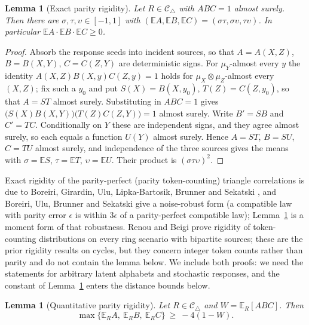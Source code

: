\documentclass[11pt]{article}
\theoremstyle{plain}
\newtheorem{lemma}[theorem]{Lemma}
\theoremstyle{definition}
\newcommand{\Ctri}{\mathcal C_{\triangle}}
\newcommand{\E}{\mathbb E}
\begin{document}
\begin{lemma}[Exact parity rigidity]\label{lem:parityrigidity}
Let $R\in\Ctri$ with $ABC=1$ almost surely. Then there are $\sigma,\tau,\upsilon\in[-1,1]$ with $(\E A,\E B,\E C)=(\sigma\tau,\sigma\upsilon,\tau\upsilon)$. In particular $\E A\cdot\E B\cdot\E C\ge0$.
\end{lemma}

\begin{proof}
Absorb the response seeds into incident sources, so that $A=A(X,Z)$, $B=B(X,Y)$, $C=C(Z,Y)$ are deterministic signs. For $\mu_Y$-almost every $y$ the identity $A(X,Z)B(X,y)C(Z,y)=1$ holds for $\mu_X\otimes\mu_Z$-almost every $(X,Z)$; fix such a $y_0$ and put $S(X)=B(X,y_0)$, $T(Z)=C(Z,y_0)$, so that $A=ST$ almost surely. Substituting in $ABC=1$ gives $\bigl(S(X)B(X,Y)\bigr)\bigl(T(Z)C(Z,Y)\bigr)=1$ almost surely. Write $B'=SB$ and $C'=TC$. Conditionally on $Y$ these are independent signs, and they agree almost surely, so each equals a function $U(Y)$ almost surely. Hence $A=ST$, $B=SU$, $C=TU$ almost surely, and independence of the three sources gives the means with $\sigma=\E S$, $\tau=\E T$, $\upsilon=\E U$. Their product is $(\sigma\tau\upsilon)^2$.
\end{proof}

Exact rigidity of the parity-perfect (parity token-counting) triangle correlations is due to Boreiri, Girardin, Ulu, Lipka-Bartosik, Brunner and Sekatski \cite{BoreiriEtAl2023}, and Boreiri, Ulu, Brunner and Sekatski \cite{BoreiriEtAl2025} give a noise-robust form (a compatible law with parity error $\epsilon$ is within $3\epsilon$ of a parity-perfect compatible law); Lemma~\ref{lem:quantrigidity} is a moment form of that robustness. Renou and Beigi \cite{RenouBeigi2022PRA,RenouBeigi2022PRL} prove rigidity of token-counting distributions on every ring scenario with bipartite sources; these are the prior rigidity results on cycles, but they concern integer token counts rather than parity and do not contain the lemma below. We include both proofs: we need the statements for arbitrary latent alphabets and stochastic responses, and the constant of Lemma~\ref{lem:quantrigidity} enters the distance bounds below.

\begin{lemma}[Quantitative parity rigidity]\label{lem:quantrigidity}
Let $R\in\Ctri$ and $W=\E_R[ABC]$. Then
\[
\max\{\E_RA,\ \E_RB,\ \E_RC\}\ \ge\ -4(1-W).
\]
\end{lemma}
\end{document}
